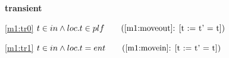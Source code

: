 \textbf{transient}
\begin{block}
\item[ \eqref{m1:tr0} ]$t \in in \land loc.t \in plf  \qquad \text{(\ref{m1:moveout}: [t := t' = t])}$ %
\item[ \eqref{m1:tr1} ]$t \in in \land loc.t = ent  \qquad \text{(\ref{m1:movein}: [t := t' = t])}$ %
\end{block}
